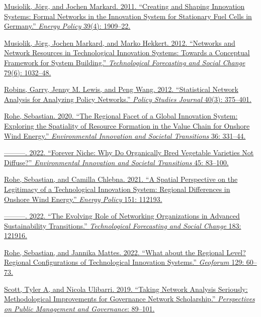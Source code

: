 \documentclass[twoside,12pt,final]{ucthesis-CA2012}
\begin{document}
\begin{ucmainmatter}
\href{https://www.zotero.org/google-docs/?hv36Bh}{Musiolik, Jörg, and Jochen Markard. 2011. ``Creating and Shaping
Innovation Systems: Formal Networks in the Innovation System for
Stationary Fuel Cells in Germany.'' \emph{Energy Policy} 39(4):
1909--22.}

\href{https://www.zotero.org/google-docs/?hv36Bh}{Musiolik, Jörg, Jochen Markard, and Marko Hekkert. 2012. ``Networks and
Network Resources in Technological Innovation Systems: Towards a
Conceptual Framework for System Building.'' \emph{Technological Forecasting
and Social Change} 79(6):
1032--48.}

\href{https://www.zotero.org/google-docs/?hv36Bh}{Robins, Garry, Jenny M. Lewis, and Peng Wang. 2012. ``Statistical
Network Analysis for Analyzing Policy Networks.'' \emph{Policy Studies
Journal} 40(3): 375--401.}

\href{https://www.zotero.org/google-docs/?hv36Bh}{Rohe, Sebastian. 2020. ``The Regional Facet of a Global Innovation
System: Exploring the Spatiality of Resource Formation in the Value
Chain for Onshore Wind Energy.'' \emph{Environmental Innovation and Societal
Transitions} 36: 331--44.}

\href{https://www.zotero.org/google-docs/?hv36Bh}{---------. 2022. ``Forever Niche: Why Do Organically Bred Vegetable
Varieties Not Diffuse?'' \emph{Environmental Innovation and Societal
Transitions} 45: 83--100.}

\href{https://www.zotero.org/google-docs/?hv36Bh}{Rohe, Sebastian, and Camilla Chlebna. 2021. ``A Spatial Perspective on
the Legitimacy of a Technological Innovation System: Regional
Differences in Onshore Wind Energy.'' \emph{Energy Policy} 151:
112193.}

\href{https://www.zotero.org/google-docs/?hv36Bh}{---------. 2022. ``The Evolving Role of Networking Organizations in
Advanced Sustainability Transitions.'' \emph{Technological Forecasting and
Social Change} 183: 121916.}

\href{https://www.zotero.org/google-docs/?hv36Bh}{Rohe, Sebastian, and Jannika Mattes. 2022. ``What about the Regional
Level? Regional Configurations of Technological Innovation Systems.''
\emph{Geoforum} 129: 60--73.}

\href{https://www.zotero.org/google-docs/?hv36Bh}{Scott, Tyler A, and Nicola Ulibarri. 2019. ``Taking Network Analysis
Seriously: Methodological Improvements for Governance Network
Scholarship.'' \emph{Perspectives on Public Management and Governance}:
89--101.}


\end{ucmainmatter}
\end{document}
